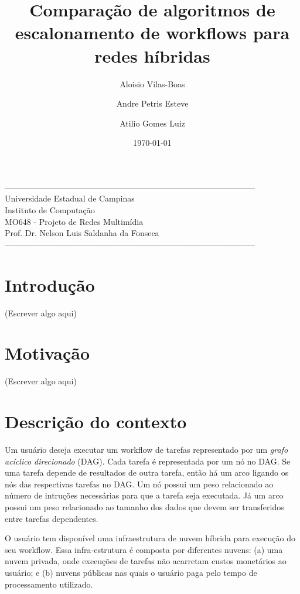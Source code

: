 \documentclass[a4paper,10pt, draft]{article}
\title{Comparação de algoritmos de escalonamento de workflows para redes híbridas}
\author{Aloisio Vilas-Boas\and Andre Petris Esteve\and Atilio Gomes Luiz}
\date{\today}
\begin{document}
\maketitle

\begin{center}
--------------------------------------------------------------------------------------------\\
Universidade Estadual de Campinas\\
Instituto de Computação\\
MO648 - Projeto de Redes Multimídia\\
Prof. Dr. Nelson Luis Saldanha da Fonseca\\
--------------------------------------------------------------------------------------------\\
\end{center}

\section{Introdução}

(Escrever algo aqui)

\section{Motivação}

(Escrever algo aqui)

\section{Descrição do contexto}

Um usuário deseja executar um workflow de tarefas representado por um \emph{grafo acíclico 
direcionado} (DAG). Cada tarefa é representada por um nó no DAG. Se uma tarefa depende de
resultados de outra tarefa, então há um arco ligando os nós das respectivas tarefas no DAG.
Um nó possui um peso relacionado ao número de intruções necessárias para que a tarefa seja executada.
Já um arco possui um peso relacionado ao tamanho dos dados que devem ser transferidos entre tarefas
dependentes.

O usuário tem disponível uma infraestrutura de nuvem híbrida para execução do 
seu workflow. Essa infra-estrutura é composta por diferentes nuvens: (a) uma nuvem 
privada, onde execuções de tarefas não acarretam custos monetários ao usuário; e (b) 
nuvens públicas nas quais o usuário paga pelo tempo de processamento utilizado.
\end{document}
